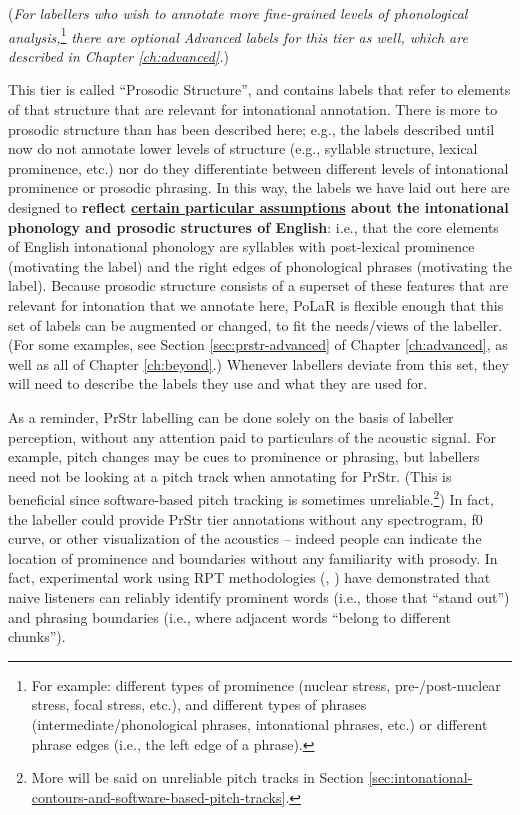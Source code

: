 \documentclass[11pt, twoside]{memoir}
\def\textlabel#1{{\relsize{-.5}\fontspec[Mapping=tex-text]{Roboto Mono}{#1}}}
\begin{document}
(\textit{For labellers who wish to annotate more fine-grained levels of phonological analysis,}\footnote{For example: different types of prominence (nuclear stress, pre-\slash post-nuclear stress, focal stress, etc.), and different types of phrases (intermediate\slash phonological phrases, intonational phrases, etc.) or different phrase edges (i.e., the left edge of a phrase).} \textit{there are optional Advanced labels for this tier as well, which are described in Chapter \ref{ch:advanced}.})

\begin{infobox}[frametitle=\textbf{A side-note about this tier}]
This tier is called “Prosodic Structure”, and contains labels that refer to elements of that structure that are relevant for intonational annotation. There is more to prosodic structure than has been described here; e.g., the labels described until now do not annotate lower levels of structure (e.g., syllable structure, lexical prominence, etc.) nor do they differentiate between different levels of intonational prominence or prosodic phrasing. In this way, the labels we have laid out here are designed to \textbf{reflect \uline{certain particular assumptions} about the intonational phonology and prosodic structures of English}: i.e., that the core elements of English intonational phonology are syllables with post-lexical prominence (motivating the \textlabel{*} label) and the right edges of phonological phrases (motivating the \textlabel{]} label). Because prosodic structure consists of a superset of these features that are relevant for intonation that we annotate here, PoLaR is flexible enough that this set of labels can be augmented or changed, to fit the needs\slash views of the labeller. (For some examples, see Section \ref{sec:prstr-advanced} of Chapter \ref{ch:advanced}, as well as all of Chapter \ref{ch:beyond}.) Whenever labellers deviate from this set, they will need to describe the labels they use and what they are used for.
\end{infobox}

As a reminder, PrStr labelling can be done solely on the basis of labeller perception, without any attention paid to particulars of the acoustic signal. For example, pitch changes may be cues to prominence or phrasing, but labellers need not be looking at a pitch track when annotating for PrStr. (This is beneficial since software-based pitch tracking is sometimes unreliable.\footnote{More will be said on unreliable pitch tracks in Section \ref{sec:intonational-contours-and-software-based-pitch-tracks}.}) In fact, the labeller could provide PrStr tier annotations without any spectrogram, f0 curve, or other visualization of the acoustics – indeed people can indicate the location of prominence and boundaries without any familiarity with prosody. In fact, experimental work using RPT methodologies (\citealt{cole-14, cole-17}, \citealt{cole-16}) have demonstrated that naive listeners can reliably identify prominent words (i.e., those that “stand out”) and phrasing boundaries (i.e., where adjacent words “belong to different chunks”).
\end{document}
